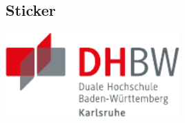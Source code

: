 \subsection{Sticker}
\begin{frame}{\subsecname}


  \blindtext

  \begin{supersticker}[+1]
    \includegraphics[width=0.5\textwidth]{DHBW.pdf}
  \end{supersticker}

\end{frame}
